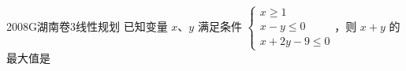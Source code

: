 
\begin{problem}{2008}{G}{湖南卷}{3}{线性规划}
已知变量 $x$、$y$ 满足条件 $\begin{cases} x\geqslant 1 \\ x-y\leqslant 0 \\ x+2y-9\leqslant 0 \end{cases}$，则 $x+y$ 的最大值是
\begin{choices}
\end{choices}
\end{problem}

\begin{answer}

\end{answer}

\begin{solutions}

\end{solutions}